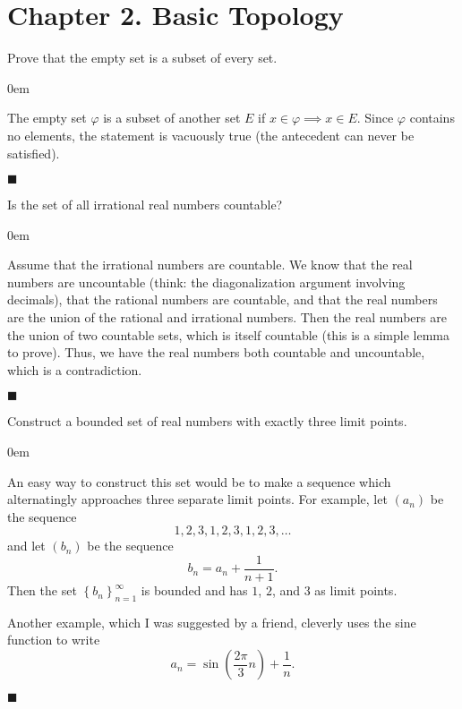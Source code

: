 \documentclass[12pt]{article}
\renewcommand{\qed}{\hfill$\blacksquare$}
\renewenvironment{proof}{\begin{addmargin}[1em]{0em}\begin{newproof}}{\end{newproof}\end{addmargin}\qed}
\newenvironment{problem}[2][Exercise]{\begin{trivlist}
\item[\hskip \labelsep {\bfseries #1}\hskip \labelsep {\bfseries #2.}]}{\end{trivlist}}
\begin{document}
\newpage
\section*{Chapter 2. Basic Topology}

\begin{problem}{2.1}
Prove that the empty set is a subset of every set.
\end{problem}
\begin{proof}
The empty set $\varphi$ is a subset of another set $E$ if $x \in \varphi \implies x \in E$. Since $\varphi$ contains no elements, the statement is vacuously true (the antecedent can never be satisfied).
\end{proof}





\begin{problem}{2.4}
Is the set of all irrational real numbers countable?
\end{problem}
\begin{proof}
Assume that the irrational numbers are countable. We know that the real numbers are uncountable (think: the diagonalization argument involving decimals), that the rational numbers are countable, and that the real numbers are the union of the rational and irrational numbers. Then the real numbers are the union of two countable sets, which is itself countable (this is a simple lemma to prove). Thus, we have the real numbers both countable and uncountable, which is a contradiction.
\end{proof}


\begin{problem}{2.5}
Construct a bounded set of real numbers with exactly three limit points.
\end{problem}
\begin{proof}
An easy way to construct this set would be to make a sequence which alternatingly approaches three separate limit points. For example, let $\left(a_n\right)$ be the sequence $$ 1,2,3,1,2,3,1,2,3,\ldots $$ and let $\left(b_n\right)$ be the sequence $$ b_n = a_n + \frac{1}{n+1}. $$ Then the set $\left\{b_n\right\}_{n=1}^{\infty}$ is bounded and has $1$, $2$, and $3$ as limit points.

Another example, which I was suggested by a friend, cleverly uses the sine function to write $$ a_n = \sin \left(\frac{2\pi}{3} n\right) + \frac{1}{n}. $$
\end{proof}
\end{document}
